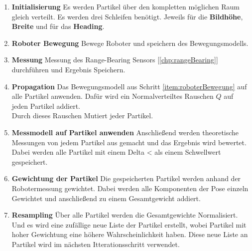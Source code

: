 \begin{enumerate}
 \item \textbf{Initialisierung}
 \label{item:init}
 Es werden Partikel über den kompletten möglichen Raum gleich verteilt. Es werden drei Schleifen benötigt. Jeweils für die \textbf{Bildhöhe}, \textbf{Breite} und für das \textbf{Heading}.\\
 
 \item \textbf{Roboter Bewegung}
 \label{item:roboterBewegung}
 Bewege Roboter und speichern des Bewegungsmodells. 
 
 \item \textbf{Messung}
 \label{item:messung}
 Messung des Range-Bearing Sensors [\ref{chp:rangeBearing}] durchführen und Ergebnis Speichern.
 
 \item \textbf{Propagation}
 \label{item:propagation}
 Das Bewegungsmodell aus Schritt \ref{item:roboterBewegung} auf alle Partikel anwenden. Dafür wird ein Normalverteiltes Rauschen $Q$ auf jeden Partikel addiert. \\
 Durch dieses Rauschen Mutiert jeder Partikel.
 
 \item \textbf{Messmodell auf Partikel anwenden}
 \label{item:messmodellAufPartikel}
 Anschließend werden theoretische Messungen von jedem Partikel aus gemacht und das Ergebnis wird bewertet. Dabei werden alle Partikel mit einem Delta < als einem Schwellwert gespeichert.
 
 \item \textbf{Gewichtung der Partikel}
 Die gespeicherten Partikel werden anhand der Robotermessung gewichtet. Dabei werden alle Komponenten der Pose einzeln Gewichtet und anschließend zu einem Gesamtgewicht addiert.
 
 \item \textbf{Resampling}
 Über alle Partikel werden die Gesamtgewichte Normalisiert. Und es wird eine zufällige neue Liste der Partikel erstellt, wobei Partikel mit hoher Gewichtung eine höhere Wahrscheinlichkeit haben. Diese neue Liste an Partikel wird im nächsten Itterationsschritt verwendet.
 
 
 
 
\end{enumerate}